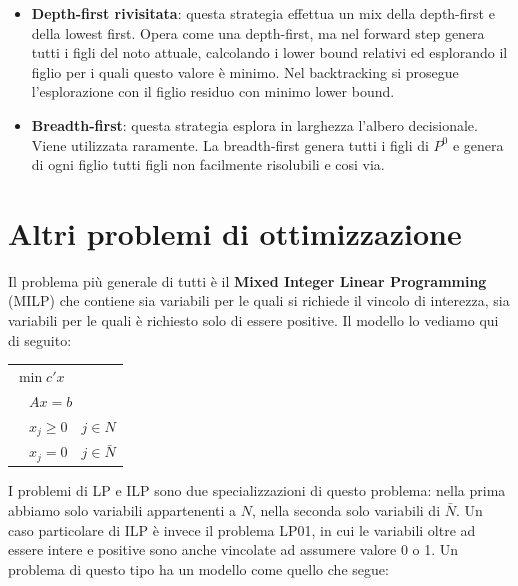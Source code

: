 \documentclass[11pt, oneside]{book}
\begin{document}
\begin{itemize}
  La strategia lowest-first ha il vantaggio di trovare la soluzione
  ottima rapidamente perch\'e esplora sempre i nodi pi\`u promettenti
  per primi, tuttavia mantiene un altissimo numero di nodi aperti e
  richiede strutture dati notevolmente complesse. Le soluzioni
  ammissibili non vengono generate rapidamente e questo implica che
  non si possono sfruttare i tagli.

\item {\bf Depth-first rivisitata}: questa strategia effettua un mix
  della depth-first e della lowest first. Opera come una depth-first,
  ma nel forward step genera tutti i figli del noto attuale,
  calcolando i lower bound relativi ed esplorando il figlio per i
  quali questo valore \`e minimo. Nel backtracking si prosegue
  l'esplorazione con il figlio residuo con minimo lower bound.

\item {\bf Breadth-first}: questa strategia esplora in larghezza
  l'albero decisionale. Viene utilizzata raramente. La breadth-first
  genera tutti i figli di $P^0$ e genera di ogni figlio tutti figli
  non facilmente risolubili e cosi via.

\end{itemize}

\section{Altri problemi di ottimizzazione}

Il problema pi\`u generale di tutti \`e il {\bf Mixed Integer Linear
  Programming} (MILP) che contiene sia variabili per le quali si
richiede il vincolo di interezza, sia variabili per le quali \`e
richiesto solo di essere positive. Il modello lo vediamo qui di
seguito:

\begin{center}
\begin{tabular}{l}
$\min{c'x}$ \\
$\quad Ax = b$ \\
$\quad x_j \geq 0 \quad j\in N$\\
$\quad x_j = 0 \quad j\in \bar{N}$
\end{tabular}
\end{center}

I problemi di LP e ILP sono due specializzazioni di questo problema:
nella prima abbiamo solo variabili appartenenti a $N$, nella seconda
solo variabili di $\bar{N}$. Un caso particolare di ILP \`e invece il
problema LP01, in cui le variabili oltre ad essere intere e positive
sono anche vincolate ad assumere valore 0 o 1. Un problema di questo
tipo ha un modello come quello che segue:
\end{document}

